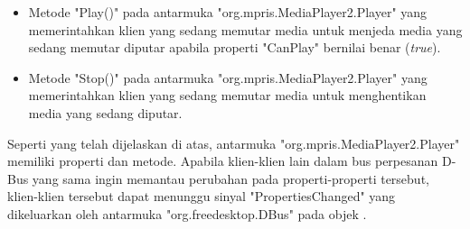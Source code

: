 \begin{itemize}
    \item Metode "Play()" pada antarmuka "org.mpris.MediaPlayer2.Player" yang memerintahkan klien yang sedang memutar media untuk menjeda media yang sedang memutar diputar apabila properti "CanPlay" bernilai benar (\textit{true}).
    
    \item Metode "Stop()" pada antarmuka "org.mpris.MediaPlayer2.Player" yang memerintahkan klien yang sedang memutar media untuk menghentikan media yang sedang diputar.
\end{itemize}

Seperti yang telah dijelaskan di atas, antarmuka "org.mpris.MediaPlayer2.Player" memiliki properti dan metode. Apabila klien-klien lain dalam bus perpesanan D-Bus yang sama ingin memantau perubahan pada properti-properti tersebut, klien-klien tersebut dapat menunggu sinyal "PropertiesChanged" yang dikeluarkan oleh antarmuka "org.freedesktop.DBus" pada objek .

